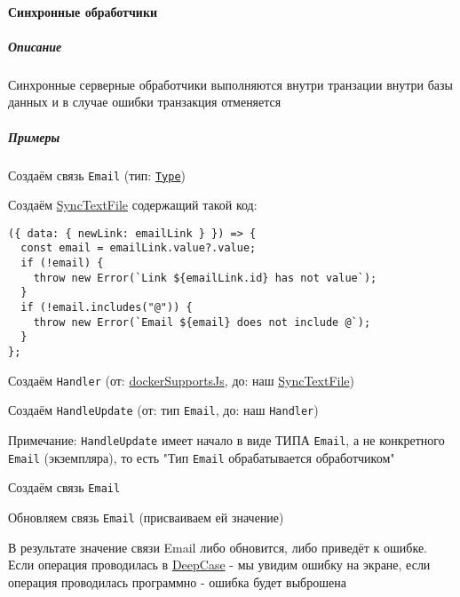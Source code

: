 \documentclass{article}
\begin{document}
\paragraph{Синхронные обработчики}
\subparagraph{Описание}

Синхронные серверные обработчики выполняются внутри транзации внутри базы
данных и в случае ошибки
транзакция отменяется
\subparagraph{Примеры}

Создаём связь \texttt{Email} (тип: \texttt{\hyperlink{type.Def}{Type}})

Создаём \hyperlink{SyncTextFile.Def}{SyncTextFile} содержащий такой код:

\begin{lstlisting}
({ data: { newLink: emailLink } }) => {
  const email = emailLink.value?.value;
  if (!email) {
    throw new Error(`Link ${emailLink.id} has not value`);
  }
  if (!email.includes("@")) {
    throw new Error(`Email ${email} does not include @`);
  }
};
\end{lstlisting}

Создаём \texttt{Handler} (от:
\hyperlink{dockerSupportsJs.Def}{dockerSupportsJs}, до: наш
\hyperlink{SyncTextFile.Def}{SyncTextFile})

Создаём \texttt{HandleUpdate} (от: тип \texttt{Email}, до: наш
\texttt{Handler})

Примечание: \texttt{HandleUpdate} имеет начало в виде ТИПА \texttt{Email}, а
не конкретного \texttt{Email} (экземпляра), то есть "Тип \texttt{Email}
обрабатывается обработчиком"

Создаём связь \texttt{Email}

Обновляем связь \texttt{Email} (присваиваем ей значение)

В результате значение связи Email либо обновится, либо приведёт к ошибке.
Если операция проводилась в \hyperlink{DeepCase.Def}{DeepCase} - мы увидим
ошибку на экране, если
операция проводилась программно - ошибка будет выброшена
\end{document}
